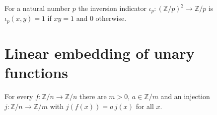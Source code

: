 \begin{definition}\label{def:inv}\leanok
For a natural number $p$ the inversion indicator
$\iota_p \colon (\mathbb{Z}/p)^2 \to \mathbb{Z}/p$ is $\iota_p(x,y) = 1$ if $xy = 1$ and $0$
otherwise.
\end{definition}

\section{Linear embedding of unary functions}\label{sec:unary}

\begin{theorem}\label{thm:unary-lin}
\leanok
For every $f \colon \mathbb{Z}/n \to \mathbb{Z}/n$ there are $m > 0$, $a \in \mathbb{Z}/m$
and an injection $j \colon \mathbb{Z}/n \to \mathbb{Z}/m$ with $j(f(x)) = a\,j(x)$ for all
$x$.
\end{theorem}


